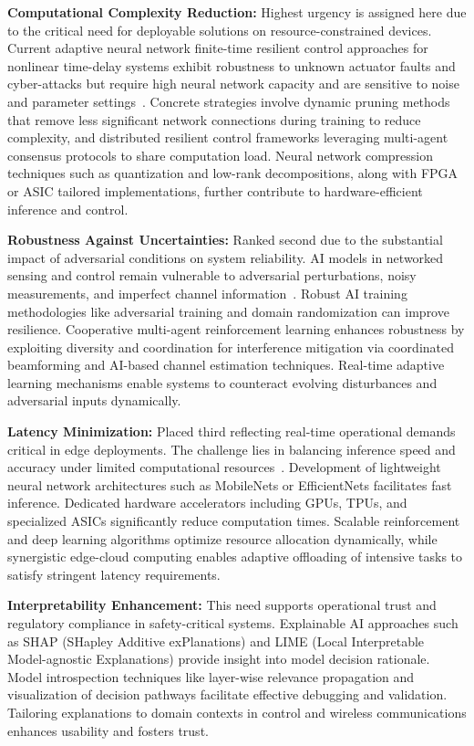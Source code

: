 \documentclass[sigconf]{acmart}
\begin{document}
\textbf{Computational Complexity Reduction:} Highest urgency is assigned here due to the critical need for deployable solutions on resource-constrained devices. Current adaptive neural network finite-time resilient control approaches for nonlinear time-delay systems exhibit robustness to unknown actuator faults and cyber-attacks but require high neural network capacity and are sensitive to noise and parameter settings~\cite{ref46}. Concrete strategies involve dynamic pruning methods that remove less significant network connections during training to reduce complexity, and distributed resilient control frameworks leveraging multi-agent consensus protocols to share computation load. Neural network compression techniques such as quantization and low-rank decompositions, along with FPGA or ASIC tailored implementations, further contribute to hardware-efficient inference and control.

\textbf{Robustness Against Uncertainties:} Ranked second due to the substantial impact of adversarial conditions on system reliability. AI models in networked sensing and control remain vulnerable to adversarial perturbations, noisy measurements, and imperfect channel information~\cite{ref48}. Robust AI training methodologies like adversarial training and domain randomization can improve resilience. Cooperative multi-agent reinforcement learning enhances robustness by exploiting diversity and coordination for interference mitigation via coordinated beamforming and AI-based channel estimation techniques. Real-time adaptive learning mechanisms enable systems to counteract evolving disturbances and adversarial inputs dynamically.

\textbf{Latency Minimization:} Placed third reflecting real-time operational demands critical in edge deployments. The challenge lies in balancing inference speed and accuracy under limited computational resources~\cite{ref50}. Development of lightweight neural network architectures such as MobileNets or EfficientNets facilitates fast inference. Dedicated hardware accelerators including GPUs, TPUs, and specialized ASICs significantly reduce computation times. Scalable reinforcement and deep learning algorithms optimize resource allocation dynamically, while synergistic edge-cloud computing enables adaptive offloading of intensive tasks to satisfy stringent latency requirements.

\textbf{Interpretability Enhancement:} This need supports operational trust and regulatory compliance in safety-critical systems. Explainable AI approaches such as SHAP (SHapley Additive exPlanations) and LIME (Local Interpretable Model-agnostic Explanations) provide insight into model decision rationale. Model introspection techniques like layer-wise relevance propagation and visualization of decision pathways facilitate effective debugging and validation. Tailoring explanations to domain contexts in control and wireless communications enhances usability and fosters trust.
\end{document}
